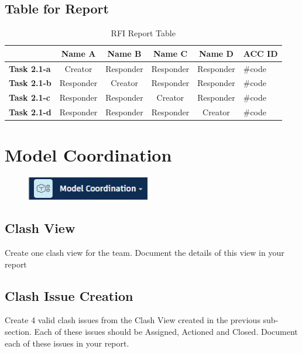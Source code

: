 \subsection{Table for Report}

\begin{table}[ht]
	\centering
	\begin{tabular}{|l|c|c|c|c|l|}
		\hline
		& \textbf{Name A} & \textbf{Name B} & \textbf{Name C} & \textbf{Name D} & \textbf{ACC ID}\\
		\hline
		\textbf{Task 2.1-a} & Creator & Responder & Responder & Responder & \#code\\
		\textbf{Task 2.1-b} & Responder & Creator & Responder & Responder & \#code\\
		\textbf{Task 2.1-c} & Responder & Responder & Creator & Responder & \#code\\
		\textbf{Task 2.1-d} & Responder & Responder & Responder & Creator & \#code\\
		\hline
	\end{tabular}
	\caption{RFI Report Table }
	\label{tab:rfi-items}
\end{table}





\newpage

\section{Model Coordination}
\begin{figure}[h!t]
	\includegraphics[height=1.0cm]{RevitAssets/modelmgmt}
	\label{fig:modelmgmt}
\end{figure}


\subsection{Clash View}
Create one clash view for the team.  Document the details of this view in your report
\subsection{Clash Issue Creation}
Create 4 valid clash issues from the Clash View created in the previous sub-section.  Each of these issues should be Assigned, Actioned and Closed.  Document each of these issues in your report.

